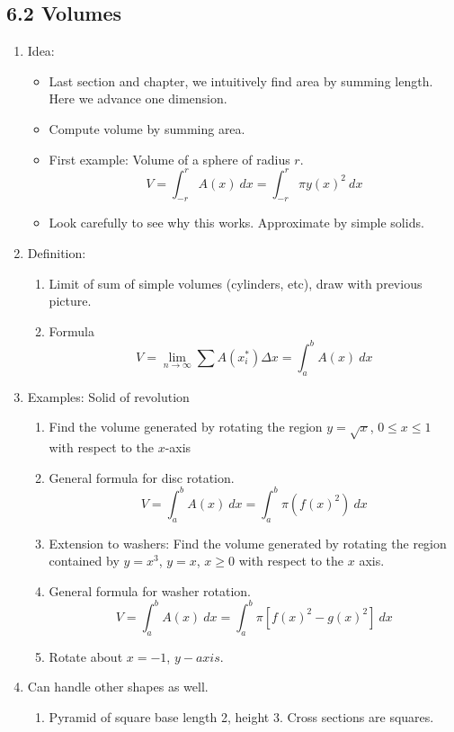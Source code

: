\documentclass{article}
\begin{document}
\subsection{6.2 Volumes }
\begin{enumerate}

\item Idea: 
\begin{itemize}
\item Last section and chapter, we intuitively find area by summing length. Here we advance one dimension.
\item Compute volume by summing area.
\item First example: Volume of a sphere of radius $r$.
\[
V = \int_{-r}^r A(x) ~dx = \int_{-r}^r \pi y(x)^2 ~dx
\]
\item Look carefully to see why this works. Approximate by simple solids.
\end{itemize}

\item Definition: 
\begin{enumerate}
\item Limit of sum of simple volumes (cylinders, etc), draw with previous picture.
\item Formula
\[
V = \lim_{n \rightarrow \infty} \sum A(x_i^*) \Delta x = \int_a^b A(x)~dx
\]
\end{enumerate}

\item Examples: Solid of revolution 
\begin{enumerate}
\item Find the volume generated by rotating the region $y =\sqrt{x}$, $0\leq x\leq 1$ with respect to the $x$-axis
\item General formula for disc rotation.
\[
V = \int_a^b A(x) ~dx = \int_a^b \pi (f(x)^2)~dx
\]
\item Extension to washers: Find the volume generated by rotating the region contained by $y =x^3$, $y=x$, $x\geq 0$ with respect to the $x$ axis.
\item General formula for washer rotation.
\[
V = \int_a^b A(x) ~dx = \int_a^b \pi \left[f(x)^2 - g(x)^2 \right]~dx
\]
\item Rotate about $x=-1$, $y-axis$.
\end{enumerate}

\item Can handle other shapes as well.
\begin{enumerate}
\item Pyramid of square base length 2, height 3. Cross sections are squares. 
\end{enumerate}
\end{enumerate}
\end{document}
